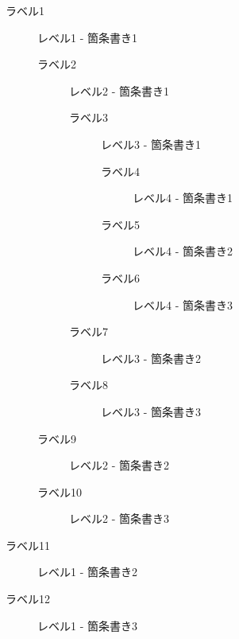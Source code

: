 \begin{description}
    \item[ラベル1] レベル1 - 箇条書き1
    \begin{description}
        \item[ラベル2] レベル2 - 箇条書き1
        \begin{description}
            \item[ラベル3] レベル3 - 箇条書き1
            \begin{description}
                \item[ラベル4] レベル4 - 箇条書き1
                \item[ラベル5] レベル4 - 箇条書き2
                \item[ラベル6] レベル4 - 箇条書き3
            \end{description}
            \item[ラベル7] レベル3 - 箇条書き2
            \item[ラベル8] レベル3 - 箇条書き3
        \end{description}
        \item[ラベル9] レベル2 - 箇条書き2
        \item[ラベル10] レベル2 - 箇条書き3
    \end{description}
    \item[ラベル11] レベル1 - 箇条書き2
    \item[ラベル12] レベル1 - 箇条書き3
\end{description}
